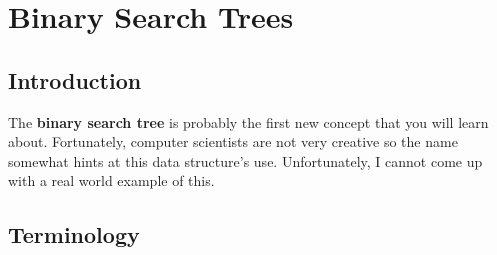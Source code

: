 \documentclass[11pt]{book}
\begin{document}
	\setcounter{chapter}{2}
	\chapter{Binary Search Trees}
	\section{Introduction}
		The \textbf{binary search tree} is probably the first new concept that
		you will learn about. Fortunately, computer scientists are not very
		creative so the name somewhat hints at this data structure's use.
		Unfortunately, I cannot come up with a real world example of this.

	\section{Terminology}
\end{document}
